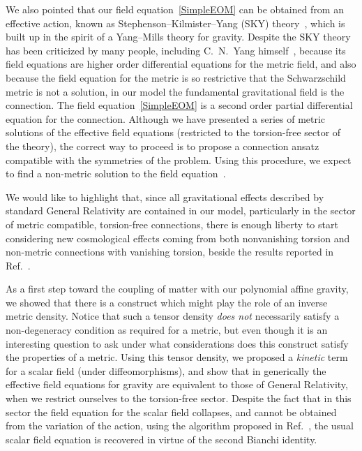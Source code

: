 \documentclass[aps,prd,12pt,twocolumn,superscriptaddress,showpacs,showkeys,reprint%
]{revtex4-1}
\renewcommand{\(}{\left(}
\renewcommand{\)}{\right)}
\renewcommand{\[}{\left[}
\renewcommand{\]}{\right]}
\begin{document}
We also pointed that our field equation~\eqref{SimpleEOM} can be obtained from an effective action, known as Stephenson--Kilmister--Yang (SKY) theory~\cite{stephenson1958quadratic,kilmister1961use,Yang1974}, which is built up in the spirit of a Yang--Mills theory for gravity. Despite the SKY theory has been criticized by many people, including C.~N.~Yang himself~\cite{JZcomm}, because its field equations are higher order differential equations for the metric field, and also because the field equation for the metric is so restrictive that the Schwarzschild metric is not a solution, in our model the fundamental gravitational field is the connection. The field equation~\eqref{SimpleEOM} is a second order partial differential equation for the connection. Although we have presented a series of metric solutions of the effective field equations (restricted to the torsion-free sector of the theory), the correct way to proceed is to propose a connection ansatz compatible with the symmetries of the problem. Using this procedure, we expect to find a non-metric solution to the field equation~\cite{OCF-future2}.

We would like to highlight that, since all gravitational effects described by standard General Relativity are contained in our model, particularly in the sector of metric compatible, torsion-free connections, there is enough liberty to start considering new cosmological effects coming from both nonvanishing torsion and non-metric connections with vanishing torsion, beside the results reported in Ref.~\cite{Chen:2013kia,Chen:2013ota}.

As a first step toward the coupling of matter with our polynomial affine gravity, we showed that there is a construct which might play the role of an inverse metric density. Notice that such a tensor density \emph{does not} necessarily satisfy a non-degeneracy condition as required for a metric, but even though it is an interesting question to ask under what considerations does this construct satisfy the properties of a metric. Using this tensor density, we proposed a \emph{kinetic} term for a scalar field (under diffeomorphisms), and show that in generically the effective field equations for gravity are equivalent to those of General Relativity, when we restrict ourselves to the torsion-free sector. Despite the fact that in this sector the field equation for the scalar field collapses, and cannot be obtained from the variation of the action, using the algorithm proposed in Ref.~\cite{Bekenstein:2014uwa}, the usual scalar field equation is recovered in virtue of the second Bianchi identity. 
\end{document}
